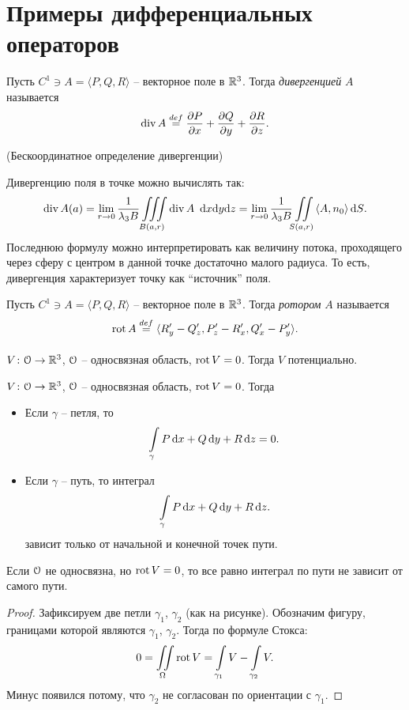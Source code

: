 \section{Примеры дифференциальных операторов}

\begin{definition}
    Пусть $C^1 \ni A = \langle P, Q, R \rangle$ -- векторное поле в $\mathbb{R}^3$. Тогда
    \textit{дивергенцией} $A$ называется
\[
    \operatorname{div} A \overset{def}{\underset{}{=}} \dfrac{\partial P}{\partial x} + \dfrac{\partial Q}{\partial y} + \dfrac{\partial R}{\partial z}
.\] 
\end{definition}

\begin{remark}(Бескоординатное определение дивергенции)

    Дивергенцию поля в точке можно вычислять так:
\[
    \operatorname{div} A(a) = \lim_{r \to 0}{\frac{1}{\lambda_3 B} \iiint\limits_{B(a, r)}{\operatorname{div} A~ \,\mathrm{d} x \mathrm{d} y \mathrm{d} z}} =
    \lim_{r \to 0}{\frac{1}{\lambda_3 B} \iint\limits_{S(a, r)}{\langle A, n_0 \rangle} \,\mathrm{d} S}
.\] 
    Последнюю формулу можно интерпретировать как величину потока, проходящего через
    сферу с центром в данной точке достаточно малого радиуса. То есть, дивергенция
    характеризует точку как ``источник'' поля.
\end{remark}

\begin{definition}
    Пусть $C^1 \ni A = \langle P, Q, R \rangle$ -- векторное поле в $\mathbb{R}^3$. Тогда
    \textit{ротором} $A$ называется
\[
    \operatorname{rot} A \overset{def}{\underset{}{=}} \langle R'_y - Q'_z, P'_z - R'_x, Q'_x - P'_y \rangle
.\] 
\end{definition}

\begin{remark}
    $V \colon \mathcal{O} \to \mathbb{R}^3$, $\mathcal{O}$ -- односвязная область, $\operatorname{rot} V = 0$. Тогда $V$ потенциально.
\end{remark}

\begin{remark}
    $V \colon \mathcal{O} \to \mathbb{R}^3$, $\mathcal{O}$ -- односвязная область, $\operatorname{rot} V = 0$. Тогда
    \begin{itemize}
        \item Если $\gamma$ -- петля, то
\[
    \int\limits_{\gamma}{P \,\mathrm{d} x + Q \,\mathrm{d} y + R \,\mathrm{d} z} = 0
.\] 
        \item Если $\gamma$ -- путь, то интеграл
\[
    \int\limits_{\gamma}{P \,\mathrm{d} x + Q \,\mathrm{d} y + R \,\mathrm{d} z}
.\] 
            зависит только от начальной и конечной точек пути.
    \end{itemize} 
\end{remark}

\begin{remark}
    Если $\mathcal{O}$ не односвязна, но $\operatorname{rot} V = 0$, то все равно интеграл по пути
    не зависит от самого пути.
\end{remark}
\begin{proof}
    Зафиксируем две петли $\gamma_1$, $\gamma_2$ (как на рисунке). Обозначим фигуру, границами которой являются
    $\gamma_1$, $\gamma_2$. Тогда по формуле Стокса:
    \[
        0 = \iint\limits_\Omega{\operatorname{rot}{V}} = \int\limits_{\gamma_1}{V} - \int\limits_{\gamma_2}{V}
    .\]
    Минус появился потому, что $\gamma_2$ не согласован по ориентации с $\gamma_1$.
\end{proof}

